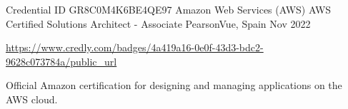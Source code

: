 
\cventry
{Credential ID GR8C0M4K6BE4QE97}
{Amazon Web Services (AWS) AWS Certified Solutions Architect - Associate}
{PearsonVue, Spain}
{Nov 2022}
{
	\begin{cvitems}
 		\item {\url{https://www.credly.com/badges/4a419a16-0e0f-43d3-bdc2-9628c073784a/public_url}}
		\item {Official Amazon certification for designing and managing applications on the AWS cloud.}
	\end{cvitems}
}
